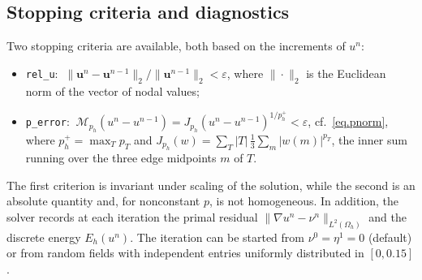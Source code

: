 \documentclass[11pt]{amsart}
\theoremstyle{definition}
\theoremstyle{remark}
\numberwithin{equation}{section}
\begin{document}
\subsection{Stopping criteria and diagnostics}\label{sec.stopping}
Two stopping criteria are available, both based on the increments of $u^n$:
\begin{itemize}
\item \texttt{rel\_u}: $\ \|\mathbf u^n-\mathbf u^{n-1}\|_{2}/\|\mathbf u^{n-1}\|_{2}<\varepsilon$, where $\|\cdot\|_2$ is the Euclidean norm of the vector of nodal values;
\item \texttt{p\_error}: $\ \mathcal M_{p_h}(u^n-u^{n-1})=J_{p_h}(u^n-u^{n-1})^{1/p_h^+}<\varepsilon$, cf.\ \eqref{eq.pnorm}, where $p_h^+=\max_Tp_T$ and $J_{p_h}(w)=\sum_T |T|\,\frac13\sum_{m}|w(m)|^{p_T}$, the inner sum running over the three edge midpoints $m$ of $T$.
\end{itemize}
The first criterion is invariant under scaling of the solution, while the second is an absolute quantity and, for nonconstant $p$, is not homogeneous. In addition, the solver records at each iteration the primal residual $\|\nabla u^n-\nu^n\|_{L^2(\Omega_h)}$ and the discrete energy $E_h(u^n)$. The iteration can be started from $\nu^0=\eta^1=0$ (default) or from random fields with independent entries uniformly distributed in $[0,0.15]$.
\end{document}
